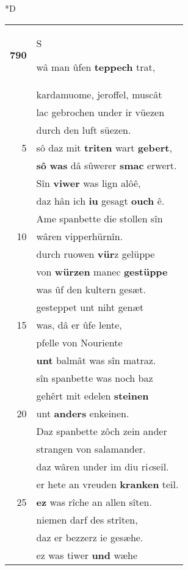 \documentclass[8pt,a4paper,notitlepage]{article}
\begin{document}
\begin{table}[ht]
\begin{minipage}[t]{0.5\linewidth}
\small
\begin{center}*D
\end{center}
\begin{tabular}{rl}
\textbf{790} & \begin{large}S\end{large}wâ man ûfen \textbf{teppech} trat,\\ 
 & kardamuome, jeroffel, muscât\\ 
 & lac gebrochen under ir vüezen\\ 
 & durch den luft süezen.\\ 
5 & sô daz mit \textbf{triten} wart \textbf{gebert},\\ 
 & \textbf{sô} \textbf{was} dâ sûwerer \textbf{smac} erwert.\\ 
 & Sîn \textbf{viwer} was lign alôê,\\ 
 & daz hân ich \textbf{iu} gesagt \textbf{ouch} ê.\\ 
 & Ame spanbette die stollen sîn\\ 
10 & wâren vipperhürnîn.\\ 
 & durch ruowen \textbf{vür}z gelüppe\\ 
 & von \textbf{würzen} manec \textbf{gestüppe}\\ 
 & was ûf den kultern gesæt.\\ 
 & gesteppet unt niht genæt\\ 
15 & was, dâ er ûfe lente,\\ 
 & pfelle von Nouriente\\ 
 & \textbf{unt} balmât was sîn matraz.\\ 
 & sîn spanbette was noch baz\\ 
 & gehêrt mit edelen \textbf{steinen}\\ 
20 & unt \textbf{anders} enkeinen.\\ 
 & Daz spanbette zôch zein ander\\ 
 & strangen von salamander.\\ 
 & daz wâren under im diu ri\textit{c}seil.\\ 
 & er hete an vreuden \textbf{kranken} teil.\\ 
25 & \textbf{ez} was rîche an allen sîten.\\ 
 & niemen darf des strîten,\\ 
 & daz er bezzerz ie gesæhe.\\ 
 & ez was tiwer \textbf{und} wæhe\\ 

\end{tabular}
\end{minipage}
\end{table}
\end{document}
